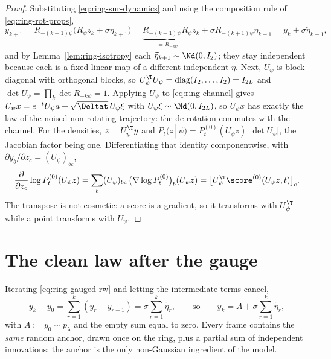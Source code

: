 \begin{proof}
Substituting \eqref{eq:ring-sur-dynamics} and using the composition rule of
\eqref{eq:ring-rot-props},
\begin{equation*}
  y_{k+1}
  = R_{-(k+1)\psi}\big(R_\psi z_k + \sigma\eta_{k+1}\big)
  = \underbrace{R_{-(k+1)\psi}R_\psi}_{= R_{-k\psi}} z_k
    + \sigma R_{-(k+1)\psi}\eta_{k+1}
  = y_k + \sigma\widetilde\eta_{k+1} ,
\end{equation*}
and by Lemma~\ref{lem:ring-isotropy} each
$\widetilde\eta_{k+1} \sim \Nd(0,I_2)$; they stay independent because each is a
fixed linear map of a different independent $\eta$. Next, $U_\psi$ is block
diagonal with orthogonal blocks, so
$U_\psi^{\T} U_\psi = \mathrm{diag}(I_2, \dots, I_2) = I_{2L}$ and
$\det U_\psi = \prod_k \det R_{-k\psi} = 1$. Applying $U_\psi$ to
\eqref{eq:ring-channel} gives
$U_\psi x = e^{-t} U_\psi a + \sqrt{\Deltat}\, U_\psi \xi$ with
$U_\psi \xi \sim \Nd(0, I_{2L})$, so $U_\psi x$ has exactly the law of the
noised non-rotating trajectory: the de-rotation commutes with the channel. For
the densities, $z = U_\psi^{\T} y$ and
$P_t(z\,|\,\psi) = P^{(0)}_t(U_\psi z)\,|\det U_\psi|$, the Jacobian factor
being one. Differentiating that identity componentwise, with
$\partial y_b/\partial z_c = (U_\psi)_{bc}$,
\begin{equation*}
  \frac{\partial}{\partial z_c} \log P^{(0)}_t(U_\psi z)
  = \sum_b (U_\psi)_{bc}\,
    \big(\nabla \log P^{(0)}_t\big)_b (U_\psi z)
  = \big[ U_\psi^{\T} \score^{(0)}(U_\psi z, t) \big]_c .
\end{equation*}
The transpose is not cosmetic: a score is a gradient, so it transforms with
$U_\psi^{\T}$ while a point transforms with $U_\psi$.
\end{proof}

\section{The clean law after the gauge}

Iterating \eqref{eq:ring-gauged-rw} and letting the intermediate terms cancel,
\begin{equation}
  y_k - y_0 = \sum_{r=1}^{k} (y_r - y_{r-1})
            = \sigma \sum_{r=1}^{k} \widetilde\eta_r ,
  \qquad\text{so}\qquad
  y_k = A + \sigma \sum_{r=1}^{k} \widetilde\eta_r ,
  \label{eq:ring-unrolled}
\end{equation}
with $A := y_0 \sim p_\lambda$ and the empty sum equal to zero. Every frame
contains the \emph{same} random anchor, drawn once on the ring, plus a partial
sum of independent innovations; the anchor is the only non-Gaussian ingredient
of the model.

